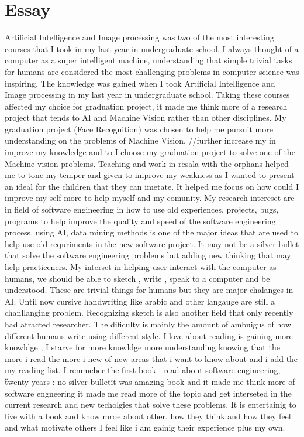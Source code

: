 \documentclass[a4paper,12pt]{article}%
\begin{document}
\section{Essay}
Artificial Intelligence and Image processing was two of the most interesting courses that I took in my last year in undergraduate school. 
I always thought of a computer as a super intelligent machine, understanding that simple trivial tasks for humans are considered the most challenging problems in computer science was inspiring. The knowledge was gained when I took Artificial Intelligence and Image processing in my last year in undergraduate school. Taking these courses affected my choice for graduation project, it made me think more of a research project that tends to AI and Machine Vision rather than other disciplines. My graduation project (Face Recognition) was chosen to help me pursuit more understanding on the problems of Machine Vision. 
//further increase my  in  improve my knowledge and  to I choose my graduation project  to solve one of the Machine vision problems. 
Teaching and work in resala with the orphans helped me to tone my temper and given to improve my weakness as I wanted to present an ideal for the children that they can imetate. It helped me focus on how could I improve my self more to help myself and my comunity. 
 My research intereset are in field of software engineering in how to use old experiences, projects, bugs, programs to help improve the quality and speed of the software engineering process. using AI, data mining methods is one of the major ideas that are used to help use old requriments in the new software project.  It may not be a silver bullet that solve the software engineering problems but adding new thinking that may help practiceners. 
 My interset in helping user interact with the computer as humans, we should be able to sketch , write , speak to a computer and be understood. These are trivial things for humans but they are major chalanges in AI. Until now cursive handwriting like arabic and other langauge are still a chanllanging problem. Recognizing sketch is also another field that only recently had atracted researcher. The dificulty is mainly the amount of ambuigus of how different humans write using different style. 
 I love about reading is gaining more knowldge , I starve for more knowldge more understanding knowing that the more i read the more i new of new areas that i want to know about and i add the my reading list. I remmeber the first book i read about software engineering, \"twenty years : no silver bullet\" it was amazing book and it made me think more of software engneering it made me read more of the topic and get interseted in the current research and new techolgies that solve these problems.   It is entertainig to live with a book and know mroe about other, how they think and how they feel and what motivate others I feel like i am gainig their experience plus my own.   
\end{document}
